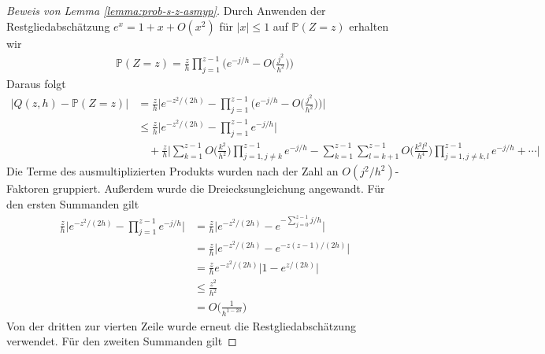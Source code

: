 \documentclass[a4paper, 11pt, ngerman]{article}
\renewcommand{\P}{\mathbb{P}}
\theoremstyle{definition}
\theoremstyle{plain}
\theoremstyle{remark}
\begin{document}
\begin{proof}[Beweis von Lemma \ref{lemma:prob-s-z-asmyp}]
    Durch Anwenden der Restgliedabschätzung $e^x = 1 + x + O(x^2)$ für $|x| \le 1$ auf $\P(Z = z)$ erhalten wir
    \begin{align*}
        \P(Z = z) = \frac z h \prod_{j = 1}^{z - 1}
        \Bigg ( e^{-j/h} - O \bigg (\frac {j^2} {h^2} \bigg ) \Bigg )
    \end{align*}
    Daraus folgt
    \begin{align*}
        \vert Q(z, h) - \P(Z = z) \vert
         & = \frac z h \Bigg \vert
        e^{-z^2/(2h)} -
        \prod_{j = 1}^{z - 1}
        \Bigg ( e^{-j/h} - O \bigg (\frac {j^2} {h^2} \bigg ) \Bigg )
        \Bigg \vert                      \\
         & \le \frac z h \Bigg \vert
        e^{-z^2/(2h)} -
        \prod_{j = 1}^{z - 1} e^{-j/h}
        \Bigg \vert                      \\
         & \quad + \frac z h \Bigg \vert
        \sum_{k = 1}^{z - 1} O \bigg ( \frac {k^2} {h^2} \bigg )
        \prod_{j = 1, j \ne k}^{z - 1} e^{-j/h}
        - \sum_{k = 1}^{z - 1}\sum_{l = k+1}^{z - 1}
        O \bigg ( \frac {k^2l^2} {h^4} \bigg )
        \prod_{j = 1, j \ne k,l}^{z - 1} e^{-j/h}
        + \cdots
        \Bigg \vert
    \end{align*}
    Die Terme des ausmultiplizierten Produkts wurden nach der Zahl an $O(j^2/h^2)$-Faktoren gruppiert. Außerdem wurde die Dreiecksungleichung angewandt. Für den ersten Summanden gilt
    \begin{align*}
        \frac z h \Bigg \vert
        e^{-z^2/(2h)} -
        \prod_{j = 1}^{z - 1} e^{-j/h}
        \Bigg \vert
         & = \frac z h \Big \vert
        e^{-z^2/(2h)} -
        e^{-\sum_{j = 0}^{z - 1} j/h}
        \Big \vert                                       \\
         & = \frac z h \Big \vert
        e^{-z^2/(2h)} -  e^{-z(z - 1)/(2h)}
        \Big \vert                                       \\
         & = \frac z h e^{-z^2/(2h)} \Big \vert
        1 - e^{z/(2h)}
        \Big \vert                                       \\
         & \le \frac {z^2} {h^2}                         \\
         & = O \bigg ( \frac 1 {h^{1 - 2\delta}} \bigg )
    \end{align*}
    Von der dritten zur vierten Zeile wurde erneut die Restgliedabschätzung verwendet. Für den zweiten Summanden gilt

\end{proof}
\end{document}
